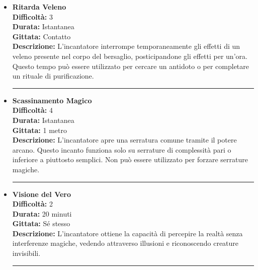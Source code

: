 \documentclass[./magie.tex]{subfiles}
\begin{document}
\begin{itemize}

\item \textbf{Ritarda Veleno} \\
\textbf{Difficoltà:} 3 \\
\textbf{Durata:} Istantanea \\
\textbf{Gittata:} Contatto \\
\textbf{Descrizione:} L'incantatore interrompe temporaneamente gli effetti di un veleno presente nel corpo del bersaglio, posticipandone gli effetti per un'ora. Questo tempo può essere utilizzato per cercare un antidoto o per completare un rituale di purificazione.

\vspace{0.2cm}
\noindent
\begin{center}
\rule{\textwidth}{0.4pt} 
\end{center}
\vspace{0.2cm}

\item \textbf{Scassinamento Magico} \\
\textbf{Difficoltà:} 4 \\
\textbf{Durata:} Istantanea \\
\textbf{Gittata:} 1 metro \\
\textbf{Descrizione:} L'incantatore apre una serratura comune tramite il potere arcano. Questo incanto funziona solo su serrature di complessità pari o inferiore a piuttosto semplici. Non può essere utilizzato per forzare serrature magiche.

\vspace{0.2cm}
\noindent
\begin{center}
\rule{\textwidth}{0.4pt} 
\end{center}
\vspace{0.2cm}

\item \textbf{Visione del Vero} \\
\textbf{Difficoltà:} 2 \\
\textbf{Durata:} 20 minuti \\
\textbf{Gittata:} Sé stesso \\
\textbf{Descrizione:} L'incantatore ottiene la capacità di percepire la realtà senza interferenze magiche, vedendo attraverso illusioni e riconoscendo creature invisibili.

\vspace{0.2cm}
\noindent
\begin{center}
\rule{\textwidth}{0.4pt} 
\end{center}
\vspace{0.2cm}


\end{itemize}
\end{document}
